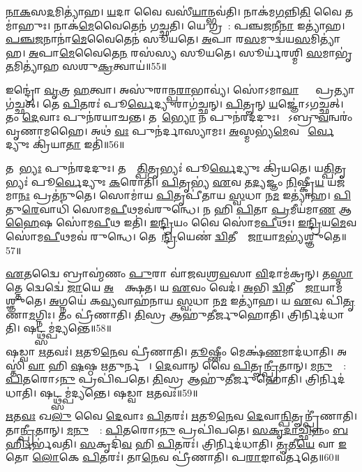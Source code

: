 \ul{𑌨𑌾}\ul{𑌕}𑌸\ul{𑌦}𑌮𑌿𑌤𑍍𑌯𑌾॑𑌹।
\ul{𑌯}𑌦𑌾 𑌵𑍈 𑌵𑌸𑍀॑\ul{𑌯𑌾}𑌨𑍍𑌭𑌵॑𑌤𑌿।
𑌨𑌾𑌕॑𑌮\ul{𑌗}𑌨𑍍𑌨𑌿\ul{𑌤𑌿} 𑌵𑍈 𑌤𑌮𑌾॑𑌹𑍁𑌃।
𑌨𑌾𑌕॑\ul{𑌮𑍇}𑌵𑍈𑌤𑍇𑌨॑ 𑌗𑌚𑍍𑌛𑌤𑌿।
𑌯𑍇 𑌗𑍍𑌰𑌹𑌾᳚: 𑌪𑌞𑍍𑌚\ul{𑌜}𑌨𑍀\ul{𑌨𑌾} 𑌇𑌤𑍍𑌯𑌾॑𑌹।
\ul{𑌪}\ul{𑌞𑍍𑌚}\ul{𑌜}𑌨𑌾𑌨𑌾॑\ul{𑌮𑍇}𑌵𑍈𑌤𑍇𑌨॑ 𑌸𑍂𑌯𑌤𑍇।
\ul{𑌅}𑌪𑌾 𑌰\ul{𑌸}𑌮𑍁𑌦𑍍𑌵॑𑌯\ul{𑌸}𑌮𑌿\-𑌤𑍍𑌯𑌾॑𑌹।
\ul{𑌅}𑌪𑌾\ul{𑌮𑍇}𑌵𑍈𑌤𑍇\ul{𑌨} 𑌰𑌸॑𑌸𑍍𑌯 𑌸𑍂𑌯𑌤𑍇।
𑌸𑍂𑌰𑍍𑌯॑𑌰𑌶𑍍𑌮𑌿 \ul{𑌸}𑌮𑌾𑌭𑍃॑\ul{𑌤}𑌮𑌿𑌤𑍍𑌯𑌾॑𑌹 𑌸𑌶𑍁\ul{𑌕𑍍𑌰}𑌤𑍍𑌵𑌾𑌯॑॥55॥\anuvakamend[\ul{𑌗}\ul{𑌚𑍍𑌛}\ul{𑌤𑌿} \ul{𑌸𑍂}𑌯\ul{𑌤𑍇} 𑌨𑌵॑ 𑌚]

𑌇𑌨𑍍𑌦𑍍𑌰𑍋॑ \ul{𑌵𑍃}𑌤𑍍𑌰 \ul{𑌹}𑌤𑍍𑌵𑌾।
𑌅𑌸𑍁॑𑌰𑌾𑌨𑍍𑌪\ul{𑌰𑌾}𑌭𑌾𑌵𑍍𑌯॑।
𑌸𑍋॑𑌽𑌮𑌾\ul{𑌵𑌾}𑌸𑍍𑌯𑌾𑌂᳚ 𑌪𑍍𑌰𑌤𑍍𑌯𑌾𑌗॑𑌚𑍍𑌛𑌤𑍍।
𑌤𑍇 \ul{𑌪𑌿}𑌤𑌰𑌃॑ 𑌪𑍂\ul{𑌰𑍍𑌵𑍇}𑌦𑍍𑌯𑍁𑌰𑌾𑌗॑𑌚𑍍𑌛𑌨𑍍।
\ul{𑌪𑌿}𑌤𑍄𑌨𑍍 \ul{𑌯}𑌜𑍍𑌞𑍋॑\-𑌽𑌗𑌚𑍍𑌛𑌤𑍍।
𑌤𑌂 \ul{𑌦𑍇}𑌵𑌾𑌃 𑌪𑍁𑌨॑𑌰𑌯𑌾𑌚𑌨𑍍𑌤।
𑌤𑌮𑍇᳚\ul{𑌭𑍍𑌯𑍋} 𑌨 𑌪𑍁𑌨॑𑌰𑌦𑌦𑍁𑌃।
𑌤𑍇᳚𑌽𑌬𑍍𑌰𑍁\ul{𑌵}𑌨𑍍𑌵𑌰𑌂॑ 𑌵𑍃𑌣𑌾𑌮𑌹𑍈।
𑌅𑌥॑ \ul{𑌵𑌃} 𑌪𑍁𑌨॑𑌰𑍍𑌦𑌾𑌸𑍍𑌯𑌾𑌮𑌃।
\ul{𑌅}𑌸𑍍𑌮𑌭𑍍𑌯॑\ul{𑌮𑍇}𑌵 𑌪𑍂᳚\ul{𑌰𑍍𑌵𑍇}𑌦𑍍𑌯𑍁𑌃 𑌕𑍍𑌰𑌿॑𑌯𑌾\ul{𑌤𑌾} 𑌇𑌤𑌿॑॥56॥

𑌤𑌮𑍇᳚\ul{𑌭𑍍𑌯𑌃} 𑌪𑍁𑌨॑𑌰𑌦𑌦𑍁𑌃।
𑌤𑌸𑍍𑌮𑌾᳚\ul{𑌤𑍍𑌪𑌿}𑌤𑍃𑌭𑍍𑌯𑌃॑ 𑌪𑍂\ul{𑌰𑍍𑌵𑍇}𑌦𑍍𑌯𑍁𑌃 𑌕𑍍𑌰𑌿॑𑌯𑌤𑍇।
𑌯\ul{𑌤𑍍𑌪𑌿}𑌤𑍃𑌭𑍍𑌯𑌃॑ 𑌪𑍂\ul{𑌰𑍍𑌵𑍇}𑌦𑍍𑌯𑍁𑌃 \ul{𑌕}𑌰𑍋𑌤𑌿॑।
\ul{𑌪𑌿}𑌤𑍃𑌭𑍍𑌯॑ \ul{𑌏}𑌵 𑌤\ul{𑌦𑍍𑌯}𑌜𑍍𑌞𑌂 \ul{𑌨𑌿}𑌷𑍍𑌕𑍍𑌰𑍀\ul{𑌯} 𑌯𑌜॑𑌮𑌾\ul{𑌨𑌃} 𑌪𑍍𑌰𑌤॑𑌨𑍁𑌤𑍇।
𑌸𑍋𑌮𑌾॑𑌯 \ul{𑌪𑌿}𑌤𑍃𑌪𑍀॑𑌤𑌾𑌯 \ul{𑌸𑍍𑌵}𑌧𑌾 𑌨\ul{𑌮} 𑌇𑌤𑍍𑌯𑌾॑𑌹।
\ul{𑌪𑌿}𑌤𑍁\ul{𑌰𑍇}𑌵𑌾𑌧𑌿॑ 𑌸𑍋𑌮\ul{𑌪𑍀}𑌥𑌮𑌵॑𑌰𑍁𑌨𑍍𑌧𑍇।
𑌨 𑌹𑌿 \ul{𑌪𑌿}𑌤𑌾 \ul{𑌪𑍍𑌰}𑌮𑍀𑌯॑𑌮𑌾\ul{𑌣} 𑌆\ul{𑌹𑍈}𑌷 𑌸𑍋॑𑌮\ul{𑌪𑍀}𑌥 𑌇𑌤𑌿॑।
\ul{𑌇}\ul{𑌨𑍍𑌦𑍍𑌰𑌿}𑌯𑌂 𑌵𑍈 𑌸𑍋॑𑌮\ul{𑌪𑍀}𑌥𑌃।
\ul{𑌇}\ul{𑌨𑍍𑌦𑍍𑌰𑌿}𑌯\ul{𑌮𑍇}𑌵 𑌸𑍋॑𑌮\ul{𑌪𑍀}𑌥𑌮𑌵॑ 𑌰𑍁𑌨𑍍𑌧𑍇।
𑌤𑍇𑌨𑍇᳚\ul{𑌨𑍍𑌦𑍍𑌰𑌿}𑌯𑍇𑌣॑ \ul{𑌦𑍍𑌵𑌿}𑌤𑍀𑌯𑌾𑌂᳚ \ul{𑌜𑌾}𑌯𑌾\ul{𑌮}𑌭𑍍𑌯॑𑌶𑍍𑌞𑍁𑌤𑍇॥57॥

\ul{𑌏}𑌤𑌦𑍍𑌵𑍈 𑌬𑍍𑌰𑌾𑌹𑍍𑌮॑𑌣𑌂 \ul{𑌪𑍁}𑌰𑌾 𑌵𑌾॑𑌜𑌵𑌶𑍍𑌰\ul{𑌵}𑌸𑌾 \ul{𑌵𑌿}𑌦𑌾𑌮॑𑌕𑍍𑌰𑌨𑍍।
𑌤\ul{𑌸𑍍𑌮𑌾}𑌤𑍍𑌤𑍇 𑌦𑍍𑌵𑍇𑌦𑍍𑌵𑍇॑ \ul{𑌜𑌾}𑌯𑍇 \ul{𑌅}𑌭𑍍𑌯𑌾᳚𑌕𑍍𑌷𑌤।
𑌯 \ul{𑌏}𑌵𑌂 𑌵𑍇𑌦॑।
\ul{𑌅}𑌭𑌿 \ul{𑌦𑍍𑌵𑌿}𑌤𑍀𑌯𑌾𑌂᳚ \ul{𑌜𑌾}𑌯𑌾𑌮॑𑌶𑍍𑌞𑍁𑌤𑍇।
\ul{𑌅}𑌗𑍍𑌨𑌯𑍇॑ 𑌕\ul{𑌵𑍍𑌯}𑌵𑌾𑌹॑𑌨𑌾𑌯 \ul{𑌸𑍍𑌵}𑌧𑌾 𑌨\ul{𑌮} 𑌇𑌤𑍍𑌯𑌾॑𑌹।
𑌯 \ul{𑌏}𑌵 𑌪𑌿॑\ul{𑌤𑍃}𑌣𑌾\ul{𑌮}𑌗𑍍𑌨𑌿𑌃।
𑌤𑌂 𑌪𑍍𑌰𑍀॑𑌣𑌾𑌤𑌿।
\ul{𑌤𑌿}𑌸𑍍𑌰 𑌆𑌹𑍁॑𑌤𑍀𑌰𑍍𑌜𑍁𑌹𑍋𑌤𑌿।
𑌤𑍍𑌰𑌿𑌰𑍍𑌨𑌿𑌦॑𑌧𑌾𑌤𑌿।
𑌷𑌟𑍍𑌥𑍍𑌸𑌮𑍍𑌪॑𑌦𑍍𑌯𑌨𑍍𑌤𑍇॥58॥

𑌷𑌡𑍍𑌵𑌾 \ul{𑌋}𑌤𑌵𑌃॑।
\ul{𑌋}𑌤𑍂\ul{𑌨𑍇}𑌵 𑌪𑍍𑌰𑍀॑𑌣𑌾𑌤𑌿।
\ul{𑌤𑍂}𑌷𑍍𑌣𑍀𑌂 𑌮𑍇𑌕𑍍𑌷॑\ul{𑌣}𑌮𑌾𑌦॑𑌧𑌾𑌤𑌿।
𑌅𑌸𑍍𑌤𑌿॑ \ul{𑌵𑌾} 𑌹𑌿 \ul{𑌷}𑌷𑍍𑌠 \ul{𑌋}𑌤𑍁𑌰𑍍𑌨 𑌵𑌾᳚।
\ul{𑌦𑍇}𑌵𑌾𑌨𑍍 𑌵𑍈 \ul{𑌪𑌿}𑌤𑍄\ul{𑌨𑍍𑌪𑍍𑌰𑍀}𑌤𑌾𑌨𑍍।
\ul{𑌮}\ul{𑌨𑍁}𑌷𑍍𑌯𑌾᳚: \ul{𑌪𑌿}𑌤𑌰𑍋𑌽\ul{𑌨𑍁} 𑌪𑍍𑌰𑌪𑌿॑𑌪𑌤𑍇।
\ul{𑌤𑌿}𑌸𑍍𑌰 𑌆𑌹𑍁॑𑌤𑍀𑌰𑍍𑌜𑍁𑌹𑍋𑌤𑌿।
𑌤𑍍𑌰𑌿𑌰𑍍𑌨𑌿𑌦॑𑌧𑌾𑌤𑌿।
𑌷𑌟𑍍𑌥𑍍𑌸𑌮𑍍𑌪॑𑌦𑍍𑌯𑌨𑍍𑌤𑍇।
𑌷𑌡𑍍𑌵𑌾 \ul{𑌋}𑌤𑌵𑌃॑॥59॥

\ul{𑌋}𑌤\ul{𑌵𑌃} 𑌖\ul{𑌲𑍁} 𑌵𑍈 \ul{𑌦𑍇}𑌵𑌾𑌃 \ul{𑌪𑌿}𑌤𑌰𑌃॑।
\ul{𑌋}𑌤𑍂\ul{𑌨𑍇}𑌵 \ul{𑌦𑍇}𑌵𑌾\ul{𑌨𑍍𑌪𑌿}𑌤𑍄𑌨𑍍𑌪𑍍𑌰𑍀॑𑌣𑌾𑌤𑌿।
𑌤𑌾\ul{𑌨𑍍𑌪𑍍𑌰𑍀}𑌤𑌾𑌨𑍍।
\ul{𑌮}\ul{𑌨𑍁}𑌷𑍍𑌯𑌾᳚: \ul{𑌪𑌿}𑌤𑌰𑍋𑌽\ul{𑌨𑍁} 𑌪𑍍𑌰𑌪𑌿॑𑌪𑌤𑍇।
\ul{𑌸}\ul{𑌕𑍃}\ul{𑌦𑌾}\ul{𑌚𑍍𑌛𑌿}𑌨𑍍𑌨𑌂 \ul{𑌬}\ul{𑌰𑍍}\mbox{}𑌹𑌿𑌰𑍍𑌭॑𑌵𑌤𑌿।
\ul{𑌸}𑌕𑍃𑌦𑌿॑\ul{𑌵} 𑌹𑌿 \ul{𑌪𑌿}𑌤𑌰𑌃॑।
𑌤𑍍𑌰𑌿𑌰𑍍𑌨𑌿𑌦॑𑌧𑌾𑌤𑌿।
\ul{𑌤𑍃}𑌤𑍀\ul{𑌯𑍇} 𑌵𑌾 \ul{𑌇}𑌤𑍋 \ul{𑌲𑍋}𑌕𑍇 \ul{𑌪𑌿}𑌤𑌰𑌃॑।
𑌤𑌾\ul{𑌨𑍇}𑌵 𑌪𑍍𑌰𑍀॑𑌣𑌾𑌤𑌿।
𑌪\ul{𑌰𑌾}𑌙𑌾𑌵॑𑌰𑍍𑌤𑌤𑍇॥60॥

